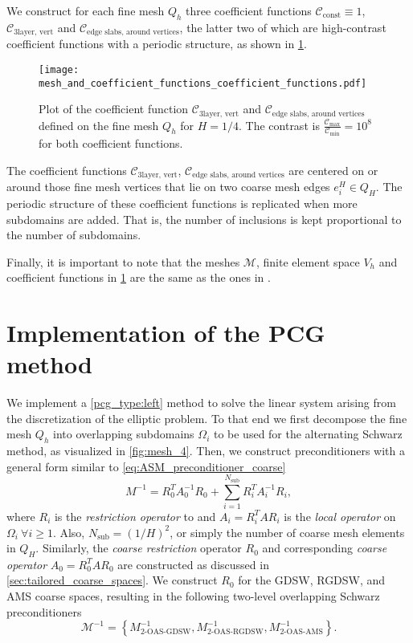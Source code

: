 We construct for each fine mesh $Q_h$ three coefficient functions $\mathcal{C}_{\text{const}}\equiv 1$, $\mathcal{C}_{\text{3layer, vert}}$ and $\mathcal{C}_{\text{edge slabs, around vertices}}$, the latter two of which are high-contrast coefficient functions with a periodic structure, as shown in \cref{fig:coefficient_functions}. 
\begin{figure}[H]
    \texttt{[image: mesh\_and\_coefficient\_functions\_coefficient\_functions.pdf]}
    \caption{Plot of the coefficient function $\mathcal{C}_{\text{3layer, vert}}$ and $\mathcal{C}_{\text{edge slabs, around vertices}}$ defined on the fine mesh $Q_h$ for $H=1/4$. The contrast is $\frac{\mathcal{C}_{\text{max}}}{\mathcal{C}_{\text{min}}} = 10^8$ for both coefficient functions.}
    \label{fig:coefficient_functions}
\end{figure}
The coefficient functions $\mathcal{C}_{\text{3layer, vert}}$, $\mathcal{C}_{\text{edge slabs, around vertices}}$ are centered on or around those fine mesh vertices that lie on two coarse mesh edges $e_i^H\in Q_H$. The periodic structure of these coefficient functions is replicated when more subdomains are added. That is, the number of inclusions is kept proportional to the number of subdomains.

Finally, it is important to note that the meshes $\mathcal{M}$, finite element space $V_h$ and coefficient functions in \cref{fig:coefficient_functions} are the same as the ones in \cite{ams_coarse_space_comp_study_Alves2024}.

\section{Implementation of the PCG method}\label{sec:implementation_pcg}
We implement a \ref{pcg_type:left} method to solve the linear system arising from the discretization of the elliptic problem. To that end we first decompose the fine mesh $Q_h$ into overlapping subdomains $\Omega_i$ to be used for the alternating Schwarz method, as visualized in \cref{fig:mesh_4}. Then, we construct preconditioners with a general form similar to \cref{eq:ASM_preconditioner_coarse}
\[
    M^{-1} = R_0^T A_0^{-1} R_0 + \sum_{i=1}^{N_{\text{sub}}} R_i^T A_i^{-1} R_i,
\]
where $R_i$ is the \textit{restriction operator} to and $A_i = R_i^T A R_i$ is the \textit{local operator} on $\Omega_i \ \forall i \geq 1$. Also, $N_{\text{sub}} = (1/H)^2$, or simply the number of coarse mesh elements in $Q_H$. Similarly, the \textit{coarse restriction} operator $R_0$ and corresponding \textit{coarse operator} $A_0 = R_0^T A R_0$ are constructed as discussed in \cref{sec:tailored_coarse_spaces}. We construct $R_0$ for the GDSW, RGDSW, and AMS coarse spaces, resulting in the following two-level overlapping Schwarz preconditioners
\begin{equation}
    \mathcal{M}^{-1} =  \left\{M^{-1}_{\text{2-OAS-GDSW}}, M^{-1}_{\text{2-OAS-RGDSW}}, M^{-1}_{\text{2-OAS-AMS}}\right\}.
    \label{eq:preconditioners}
\end{equation}